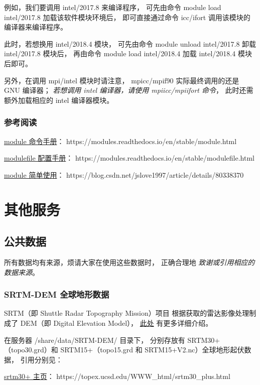 \documentclass[UTF8]{ctexart}
\newcommand{\myem}[1]{{\color{red}\em #1}}
\newcommand{\mynote}[1]{\colorbox{gray!35}{#1}}
\begin{document}
例如，我们要调用 intel/2017.8 来编译程序，
可先由命令 \mynote{module load intel/2017.8} 加载该软件模块环境后，
即可直接通过命令 icc/ifort 调用该模块的编译器来编译程序。

此时，若想换用 intel/2018.4 模块，
可先由命令 \mynote{module unload intel/2017.8} 卸载 intel/2017.8 模块后，
再由命令 \mynote{module load intel/2018.4} 加载 intel/2018.4 模块后即可。

另外，在调用 mpi/intel 模块时请注意，
mpicc/mpif90 实际最终调用的还是 GNU 编译器；
\myem{若想调用 intel 编译器，请使用 mpiicc/mpiifort 命令}，
此时还需额外加载相应的 intel 编译器模块。

\subsubsection{参考阅读}
\href{https://modules.readthedocs.io/en/stable/module.html}{module 命令手册}：
https://modules.readthedocs.io/en/stable/module.html

\href{https://modules.readthedocs.io/en/stable/modulefile.html}{modulefile 配置手册}：
https://modules.readthedocs.io/en/stable/modulefile.html

\href{https://blog.csdn.net/jslove1997/article/details/80338370}{module 简单使用}：
https://blog.csdn.net/jslove1997/article/details/80338370

\section{其他服务}
\subsection{公共数据}
所有数据均有来源，烦请大家在使用这些数据时，
正确合理地 \myem{致谢或引用相应的数据来源}。

\subsubsection{SRTM-DEM 全球地形数据}
SRTM（即 Shuttle Radar Topography Mission）项目
根据获取的雷达影像处理制成了 DEM（即 Digital Elevation Model），
\href{https://blog.seisman.info/srtm/}{此处} 有更多详细介绍。

在服务器 /share/data/SRTM-DEM/ 目录下，
分别存放有 SRTM30+（topo30.grd）和
SRTM15+（topo15.grd 和 SRTM15+V2.nc）全球地形起伏数据，
引用分别见：

\href{https://topex.ucsd.edu/WWW_html/srtm30_plus.html}{srtm30+ 主页}：
https://topex.ucsd.edu/WWW\_html/srtm30\_plus.html
\end{document}
